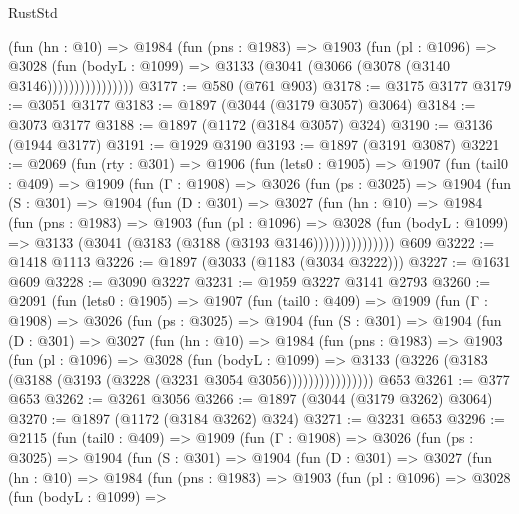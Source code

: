 \begin{lexlean}{RustStd}
\begin{coremodule}
                    (fun (hn : @10) =>
                    @1984
                      (fun (pns : @1983) =>
                      @1903
                        (fun (pl : @1096) =>
                        @3028
                          (fun (bodyL : @1099) =>
                          @3133 (@3041 (@3066 (@3078 (@3140 @3146))))))))))))))))
@3177 := @580 (@761 @903)
@3178 := @3175 @3177
@3179 := @3051 @3177
@3183 := @1897 (@3044 (@3179 @3057) @3064)
@3184 := @3073 @3177
@3188 := @1897 (@1172 (@3184 @3057) @324)
@3190 := @3136 (@1944 @3177)
@3191 := @1929 @3190
@3193 := @1897 (@3191 @3087)
@3221 := @2069
    (fun (rty : @301) =>
    @1906
      (fun (lets0 : @1905) =>
      @1907
        (fun (tail0 : @409) =>
        @1909
          (fun (Γ : @1908) =>
          @3026
            (fun (ps : @3025) =>
            @1904
              (fun (S : @301) =>
              @1904
                (fun (D : @301) =>
                @3027
                  (fun (hn : @10) =>
                  @1984
                    (fun (pns : @1983) =>
                    @1903
                      (fun (pl : @1096) =>
                      @3028
                        (fun (bodyL : @1099) =>
                        @3133 (@3041 (@3183 (@3188 (@3193 @3146)))))))))))))))
    @609
@3222 := @1418 @1113
@3226 := @1897 (@3033 (@1183 (@3034 @3222)))
@3227 := @1631 @609
@3228 := @3090 @3227
@3231 := @1959 @3227 @3141 @2793
@3260 := @2091
    (fun (lets0 : @1905) =>
    @1907
      (fun (tail0 : @409) =>
      @1909
        (fun (Γ : @1908) =>
        @3026
          (fun (ps : @3025) =>
          @1904
            (fun (S : @301) =>
            @1904
              (fun (D : @301) =>
              @3027
                (fun (hn : @10) =>
                @1984
                  (fun (pns : @1983) =>
                  @1903
                    (fun (pl : @1096) =>
                    @3028
                      (fun (bodyL : @1099) =>
                      @3133 (@3226 (@3183 (@3188 (@3193 (@3228 (@3231 @3054 @3056))))))))))))))))
    @653
@3261 := @377 @653
@3262 := @3261 @3056
@3266 := @1897 (@3044 (@3179 @3262) @3064)
@3270 := @1897 (@1172 (@3184 @3262) @324)
@3271 := @3231 @653
@3296 := @2115
    (fun (tail0 : @409) =>
    @1909
      (fun (Γ : @1908) =>
      @3026
        (fun (ps : @3025) =>
        @1904
          (fun (S : @301) =>
          @1904
            (fun (D : @301) =>
            @3027
              (fun (hn : @10) =>
              @1984
                (fun (pns : @1983) =>
                @1903
                  (fun (pl : @1096) =>
                  @3028
                    (fun (bodyL : @1099) =>

\end{coremodule}
\end{lexlean}
